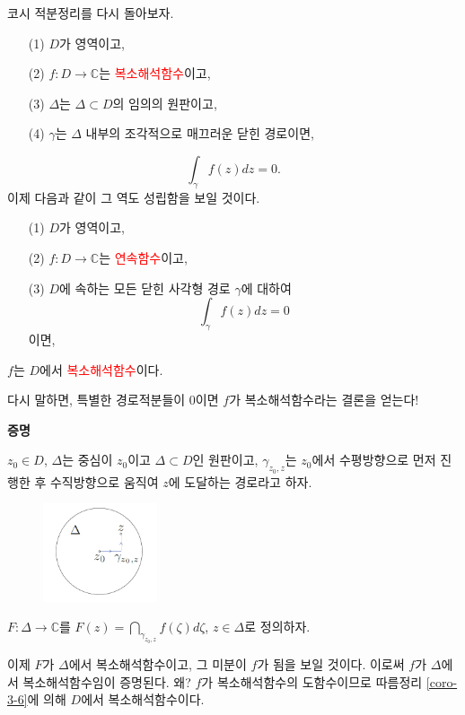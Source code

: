  코시 적분정리를 다시 돌아보자.
\begin{itemize}
\item[(1)] $D$가 영역이고, 
\item[(2)] $f:D\to \mathbb C$는 \textcolor{red}{복소해석함수}이고,
\item[(3)] $\Delta$는 $\Delta \subset D$의 임의의 원판이고,
\item[(4)] $\gamma$는 $\Delta$ 내부의 조각적으로 매끄러운 닫힌 경로이면,
\end{itemize}
\[
\int_\gamma f(z)dz = 0.
\]
이제 다음과 같이 그 역도 성립함을 보일 것이다.
\begin{salttheorem}[모레라 정리]{}{} \label{thm-3-8}

\begin{itemize}
\item[(1)] $D$가 영역이고, 
\item[(2)] $f:D\to \mathbb C$는 \textcolor{red}{연속함수}이고,
\item[(3)] $D$에 속하는 모든 닫힌 사각형 경로 $\gamma$에 대하여
\[
\int_\gamma f(z)dz = 0
\]
이면,
\end{itemize}
$f$는 $D$에서 \textcolor{red}{복소해석함수}이다.
\end{salttheorem}
다시 말하면, 특별한 경로적분들이 $0$이면
$f$가 복소해석함수라는 결론을 얻는다!

{\bf 증명}

$z_0\in D$, $\Delta$는 중심이 $z_0$이고 $\Delta \subset D$인 원판이고,
$\gamma_{z_0,z}$는 $z_0$에서 수평방향으로 먼저 진행한 후
수직방향으로 움직여 $z$에 도달하는 경로라고 하자.
\begin{figure}[h!]
\begin{center}
\includegraphics[width=0.3\textwidth]{./SaltChapter/fig-3-0-12}
\end{center}
\end{figure}

$F:\Delta \to \mathbb C$를 $F(z) = \dint_{\gamma_{z_0,z}} f(\zeta)d\zeta$, $z\in\Delta$로
정의하자.

이제 $F$가 $\Delta$에서 복소해석함수이고, 그 미분이 $f$가 됨을 보일 것이다.
이로써 $f$가 $\Delta$에서 복소해석함수임이 증명된다. 왜?
$f$가 복소해석함수의 도함수이므로 따름정리 \ref{coro-3-6}에 의해
$D$에서 복소해석함수이다.

